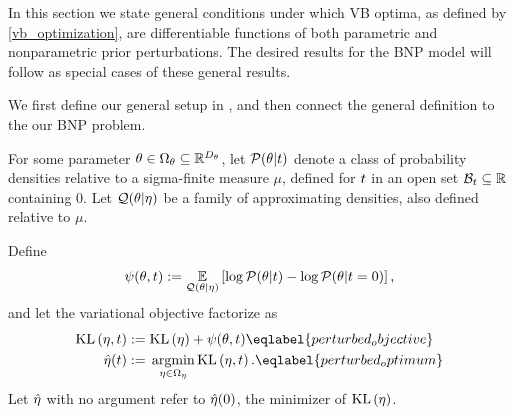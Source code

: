 In this section we state general conditions under which VB optima, as defined by
\eqref{vb_optimization}, are differentiable functions of both parametric and
nonparametric prior perturbations.  The desired results for the BNP model will
follow as special cases of these general results.

We first define our general setup in , and then connect
the general definition to the our BNP problem.

\begin{defn}
%
For some parameter $\theta \in \Omega_{\theta} \subseteq \mathbb{R}^{{D_{\theta}}}$, let
$\mathcal{P}(\theta \vert t)$ denote a class of probability densities relative to
a sigma-finite measure $\mu$, defined for $t$ in an open set $\mathcal{B}_t
\subseteq \mathbb{R}$ containing $0$.  Let $\mathcal{Q}(\theta \vert \eta)$ be a
family of approximating densities, also defined relative to $\mu$.

Define
%
\begin{align*}
%
\psi(\theta, \t) :={}
    \expect{\q(\theta \vert \eta)}
       {\log \p(\theta \vert \t) - \log \p(\theta \vert \t=0)},
%
\end{align*}
%
and let the variational objective factorize as
%
\begin{align}
%
\KL{\eta, \t} :={}& \KL{\eta} + \psi(\theta, \t)
           \eqlabel{perturbed_objective}\\
\etaopt(\t) :={}& \argmin_{\eta \in \etadom} \KL{\eta, \t}.
    \eqlabel{perturbed_optimum}
%
\end{align}
%
Let $\hat\eta$ with no argument refer to $\hat\eta(0)$, the minimizer
of $\mathrm{KL}\left(\eta\right)$.
%
\end{defn}


